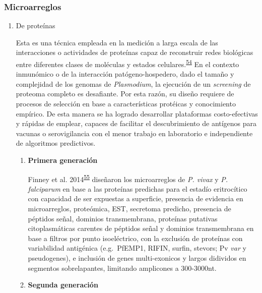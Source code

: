 \documentclass[]{article}
\begin{document}
\subsubsection{Microarreglos}\label{microarreglos}

\begin{enumerate}
\def\labelenumi{\alph{enumi}.}
\item
  De proteínas

  Esta es una técnica empleada en la medición a larga escala de las
  interacciones o actividades de proteínas capaz de reconstruir redes
  biológicas entre diferentes clases de moléculas y estados
  celulares.\textsuperscript{\protect\hyperlink{ref-uzoma2013interactome}{54}}
  En el contexto inmunómico o de la interacción patógeno-hospedero, dado
  el tamaño y complejidad de los genomas de \emph{Plasmodium}, la
  ejecución de un \emph{screening} de proteoma completo es desafiante.
  Por esta razón, su diseño requiere de procesos de selección en base a
  características protéicas y conocimiento empírico. De esta manera se
  ha logrado desarrollar plataformas costo-efectivas y rápidas de
  emplear, capaces de facilitar el descubrimiento de antígenos para
  vacunas o serovigilancia con el menor trabajo en laboratorio e
  independiente de algoritmos predictivos.

  \begin{enumerate}
  \def\labelenumii{\roman{enumii}.}
  \item
    \textbf{Primera generación}

    Finney et al.
    2014\textsuperscript{\protect\hyperlink{ref-Finney2014}{55}}
    diseñaron los microarreglos de \emph{P. vivax} y \emph{P.
    falciparum} en base a las proteínas predichas para el estadío
    eritrocítico con capacidad de ser expuestas a superficie, presencia
    de evidencia en microarreglos, proteómica, EST, secretoma predicho,
    presencia de péptidos señal, dominios transmembrana, proteínas
    putativas citoplasmáticas carentes de péptidos señal y dominios
    transmembrana en base a filtros por punto isoeléctrico, con la
    exclusión de proteínas con variabilidad antigénica (e.g.~PfEMP1,
    RIFIN, surfin, stevors; Pv \emph{var} y pseudogenes), e inclusión de
    genes multi-exonicos y largos didividos en segmentos sobrelapantes,
    limitando amplicones a 300-3000nt.
  \item
    \textbf{Segunda generación}


\end{enumerate}
\end{enumerate}
\end{document}
